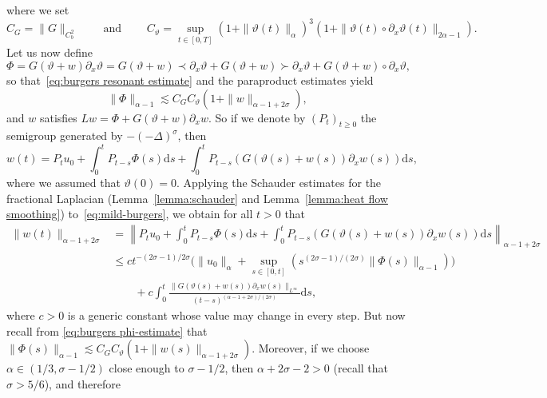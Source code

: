 \documentclass[11pt,a4paper]{article}
\newcommand{\mathd}{\mathrm{d}}
\newcommand{\tmop}[1]{\ensuremath{\operatorname{#1}}}
\theoremstyle{remark}
\begin{document}
where we set
\[
   C_{G} = \| G \|_{C^{2}_{b}} \hspace{2em} \tmop{and} \hspace{2em}  C_{\vartheta} = \sup_{t \in [ 0,T ]} ( 1+ \| \vartheta ( t ) \|_{\alpha} )^{3} ( 1+ \| \vartheta ( t ) \circ \partial_{x} \vartheta ( t ) \|_{2 \alpha -1} ) .
\]
Let us now define
\[
   \Phi = G(\vartheta + w) \partial_x \vartheta = G ( \vartheta +w ) \prec \partial_{x} \vartheta +G ( \vartheta +w ) \succ \partial_{x} \vartheta +G ( \vartheta +w ) \circ \partial_{x} \vartheta ,
\]
so that~{\eqref{eq:burgers resonant estimate}} and the paraproduct estimates yield
\begin{equation}\label{eq:burgers phi-estimate}
   \| \Phi \|_{\alpha -1} \lesssim C_{G}C_{\vartheta} ( 1+ \| w \|_{\alpha -1+2 \sigma} ) ,
\end{equation}
and $w$ satisfies $L w= \Phi +G ( \vartheta +w ) \partial_{x} w$. So if we denote by $( P_{t} )_{t \geqslant 0}$ the semigroup generated by $- (- \Delta )^{\sigma}$, then
\begin{equation}\label{eq:mild-burgers}
  w ( t ) =P_{t} u_{0} + \int_{0}^{t} P_{t-s} \Phi ( s ) \mathd s+ \int_{0}^{t} P_{t-s} ( G ( \vartheta ( s ) +w ( s ) ) \partial_{x} w ( s ) ) \mathd s,
\end{equation}
where we assumed that $\vartheta(0) = 0$. Applying the Schauder estimates for the fractional Laplacian (Lemma~\ref{lemma:schauder} and Lemma~\ref{lemma:heat flow smoothing}) to~{\eqref{eq:mild-burgers}}, we obtain for all $t>0$ that
\begin{align*}
   \| w ( t ) \|_{\alpha -1+2 \sigma} & = \left\| P_{t} u_{0} + \int_{0}^{t} P_{t-s} \Phi ( s ) \mathd s+ \int_{0}^{t} P_{t-s} ( G ( \vartheta ( s ) +w ( s ) ) \partial_{x} w ( s ) ) \mathd s \right\|_{\alpha -1+2 \sigma} \\
   & \leqslant c t^{- ( 2 \sigma -1 ) /2 \sigma} \Big( \| u_{0} \|_{\alpha} + \sup_{s \in [ 0,t ]} ( s^{( 2 \sigma -1 ) / ( 2 \sigma )} \| \Phi ( s )\|_{\alpha -1} ) \Big) \\
   &\qquad +c \int_{0}^{t} \frac{\| G ( \vartheta ( s ) +w ( s ) ) \partial_{x} w ( s ) \|_{L^{\infty}}}{( t-s )^{( \alpha -1+2 \sigma ) / ( 2 \sigma )}} \mathd s,
\end{align*}
where $c>0$ is a generic constant whose value may change in every step. But
now recall from {\eqref{eq:burgers phi-estimate}} that $\| \Phi ( s )\|_{\alpha -1} \lesssim C_{G} C_{\vartheta} ( 1+ \| w ( s ) \|_{\alpha -1+2 \sigma} )$. Moreover, if we choose $\alpha \in ( 1/3, \sigma -1/2 )$ close enough to $\sigma -1/2$, then $\alpha +2 \sigma -2>0$ (recall that $\sigma >5/6$), and therefore
\end{document}
